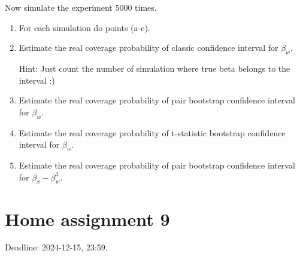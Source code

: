 \documentclass[12pt]{article}
\begin{document}
\begin{enumerate}
Now simulate the experiment 5000 times. 
\begin{enumerate}[resume]
    \item For each simulation do points (a-e).
    \item Estimate the real coverage probability of classic confidence interval for $\beta_w$. 
    
    Hint: Just count the number of simulation where true beta belongs to the interval :)
    \item Estimate the real coverage probability of pair bootstrap confidence interval for $\beta_w$. 
    \item Estimate the real coverage probability of t-statistic bootstrap confidence interval for $\beta_w$.
    \item Estimate the real coverage probability of pair bootstrap confidence interval for $\beta_x - \beta_w^3$. 
\end{enumerate}


\end{enumerate}


\section*{Home assignment 9}

Deadline: 2024-12-15, 23:59.
\end{document}
